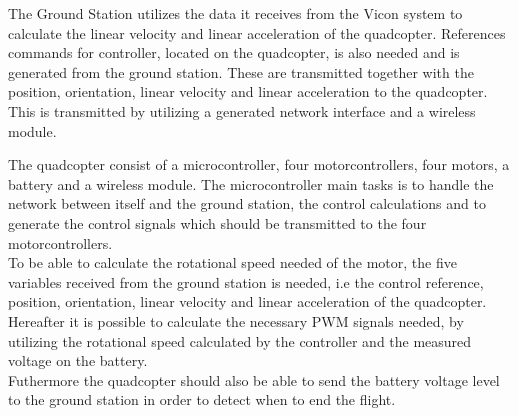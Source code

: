 The Ground Station utilizes the data it receives from the Vicon system to calculate the linear velocity and linear acceleration of the quadcopter. References commands for controller, located on the quadcopter, is also needed and is generated from the ground station. These are transmitted together with the position, orientation, linear velocity and linear acceleration to the quadcopter. This is transmitted by utilizing a generated network interface and a wireless module.

The quadcopter consist of a microcontroller, four motorcontrollers, four motors, a battery and a wireless module. The microcontroller main tasks is to handle the network between itself and the ground station, the control calculations and to generate the control signals which should be transmitted to the four motorcontrollers. \\To be able to calculate the rotational speed needed of the motor, the five variables received from the ground station is needed, i.e the control reference, position, orientation, linear velocity and linear acceleration of the quadcopter. Hereafter it is possible to calculate the necessary PWM signals needed, by utilizing the rotational speed calculated by the controller and the measured voltage on the battery. \\Futhermore the quadcopter should also be able to send the battery voltage level to the ground station in order to detect when to end the flight.






